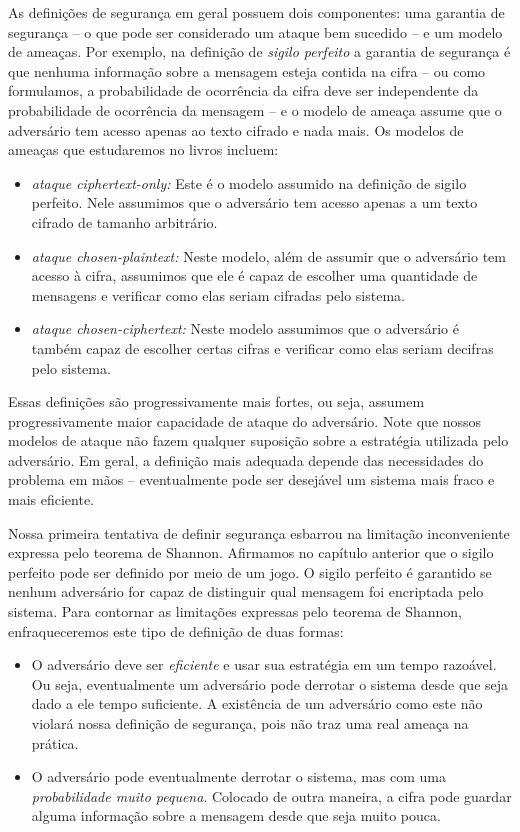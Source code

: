 As definições de segurança em geral possuem dois componentes: uma garantia de segurança -- o que pode ser considerado um ataque bem sucedido -- e um modelo de ameaças.
Por exemplo, na definição de {\em sigilo perfeito} a garantia de segurança é que nenhuma informação sobre a mensagem esteja contida na cifra -- ou como formulamos, a probabilidade de ocorrência da cifra deve ser independente da probabilidade de ocorrência da mensagem -- e o modelo de ameaça assume que o adversário tem acesso apenas ao texto cifrado e nada mais.
Os modelos de ameaças que estudaremos no livros incluem:
\begin{itemize}
\item {\em ataque ciphertext-only:} Este é o modelo assumido na definição de sigilo perfeito.
Nele assumimos que o adversário tem acesso apenas a um texto cifrado de tamanho arbitrário.
\item {\em ataque chosen-plaintext:} Neste modelo, além de assumir que o adversário tem acesso à cifra, assumimos que ele é capaz de escolher uma quantidade de mensagens e verificar como elas seriam cifradas pelo sistema.
\item {\em ataque chosen-ciphertext:} Neste modelo assumimos que o adversário é também capaz de escolher certas cifras e verificar como elas seriam decifras pelo sistema.
\end{itemize}

Essas definições são progressivamente mais fortes, ou seja, assumem progressivamente maior capacidade de ataque do adversário.
Note que nossos modelos de ataque não fazem qualquer suposição sobre a estratégia utilizada pelo adversário.
Em geral, a definição mais adequada depende das necessidades do problema em mãos -- eventualmente pode ser desejável um sistema mais fraco e mais eficiente.

Nossa primeira tentativa de definir segurança esbarrou na limitação inconveniente expressa pelo teorema de Shannon.
Afirmamos no capítulo anterior que o sigilo perfeito pode ser definido por meio de um jogo.
O sigilo perfeito é garantido se nenhum adversário for capaz de distinguir qual mensagem foi encriptada pelo sistema.
Para contornar as limitações expressas pelo teorema de Shannon, enfraqueceremos este tipo de definição de duas formas:
\begin{itemize}
\item O adversário deve ser {\em eficiente} e usar sua estratégia em um tempo razoável.
  Ou seja, eventualmente um adversário pode derrotar o sistema desde que seja dado a ele tempo suficiente.
  A existência de um adversário como este não violará nossa definição de segurança, pois não traz uma real ameaça na prática.
\item O adversário pode eventualmente derrotar o sistema, mas com uma {\em probabilidade muito pequena}.
Colocado de outra maneira, a cifra pode guardar alguma informação sobre a mensagem desde que seja muito pouca.
\end{itemize}

